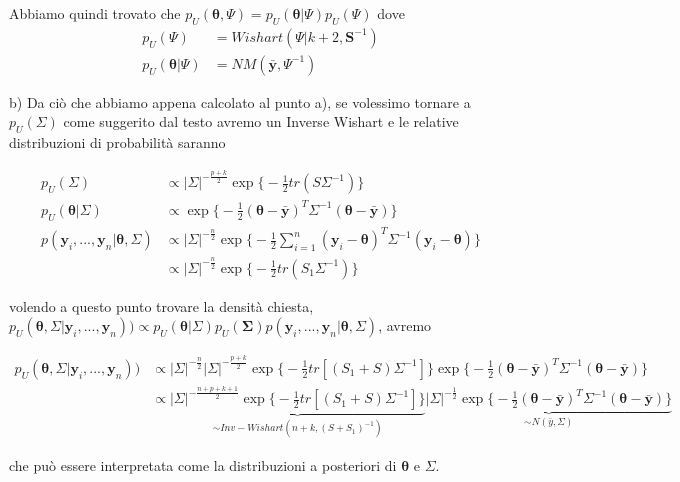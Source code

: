 Abbiamo quindi trovato che $p_{U}(\boldsymbol{\theta},\Psi) = p_{U}(\boldsymbol{\theta}|\Psi)p_{U}(\Psi)$ dove 
\begin{align*}
p_{U}(\Psi) &= Wishart(\Psi| k+2, \textbf{S}^{-1}) \\ p_{U}(\boldsymbol{\theta}|\Psi) &= NM(\bar{\textbf{y}},\Psi^{-1})
\end{align*}


b) Da ciò che abbiamo appena calcolato al punto a), se volessimo tornare a $p_U(\Sigma)$ come suggerito dal testo avremo un Inverse Wishart e le relative distribuzioni di probabilità saranno

\begin{align*}
p_{U}(\Sigma) &\propto |\Sigma|^{-\frac{p+k}{2}}\exp\Big\{-\frac{1}{2}tr(S\Sigma^{-1})\Big\}\\
p_{U}(\boldsymbol{\theta}|\Sigma) &\propto \exp\Big\{-\frac{1}{2}(\boldsymbol{\theta} - \bar{\textbf{y}})^T\Sigma^{-1}(\boldsymbol{\theta}- \bar{\textbf{y}})\Big\}\\
p(\textbf{y}_i,...,\textbf{y}_n|\boldsymbol{\theta},\Sigma) &\propto |\Sigma|^{-\frac{n}{2}}\exp\Big\{-\frac{1}{2}\sum_{i=1}^n(\textbf{y}_i-\boldsymbol{\theta})^T\Sigma^{-1}(\textbf{y}_i-\boldsymbol{\theta})\Big\} \\
&\propto |\Sigma|^{-\frac{n}{2}}\exp\Big\{-\frac{1}{2}tr(S_1\Sigma^{-1})\Big\}
\end{align*}

volendo a questo punto trovare la densità chiesta, $p_U(\boldsymbol{\theta},\Sigma|\textbf{y}_i,...,\textbf{y}_n)) \propto p_U(\boldsymbol{\theta}|\Sigma)p_U(\boldsymbol{\Sigma})p(\textbf{y}_i,...,\textbf{y}_n|\boldsymbol{\theta},\Sigma)$, avremo

\begin{align*}
p_U(\boldsymbol{\theta},\Sigma|\textbf{y}_i,...,\textbf{y}_n)) &\propto |\Sigma|^{-\frac{n}{2}}|\Sigma|^{-\frac{p+k}{2}}\exp\Big\{-\frac{1}{2}tr[(S_1+S)\Sigma^{-1}] \Big\} \exp\Big\{-\frac{1}{2}(\boldsymbol{\theta} - \bar{\textbf{y}})^T\Sigma^{-1}(\boldsymbol{\theta}- \bar{\textbf{y}})\Big\}\\
&\propto \underbrace{|\Sigma|^{-\frac{n+p+k+1}{2}}\exp\Big\{-\frac{1}{2}tr[(S_1+S)\Sigma^{-1}] \Big\}}_\text{$\sim Inv-Wishart(n+k,(S+S_1)^{-1})$} \underbrace{|\Sigma|^{-\frac{1}{2}}\exp\Big\{-\frac{1}{2}(\boldsymbol{\theta} - \bar{\textbf{y}})^T\Sigma^{-1}(\boldsymbol{\theta}- \bar{\textbf{y}})\Big\}}_\text{$\sim N(\bar{y},\Sigma)$}
\end{align*}

che può essere interpretata come la distribuzioni a posteriori di $\boldsymbol{\theta}$ e $\Sigma$.

